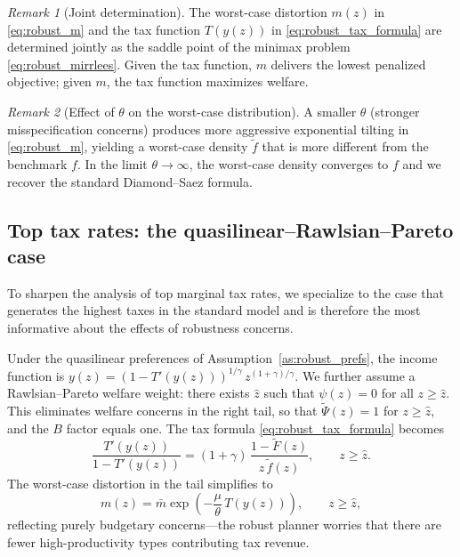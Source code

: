 \documentclass[12pt,a4paper]{article}
\theoremstyle{definition}
\theoremstyle{plain}
\theoremstyle{remark}
\newtheorem{remark}{Remark}[section]
\begin{document}
\begin{remark}[Joint determination]
The worst-case distortion $m(z)$ in \eqref{eq:robust_m} and the tax function $T(y(z))$ in \eqref{eq:robust_tax_formula} are determined jointly as the saddle point of the minimax problem \eqref{eq:robust_mirrlees}. Given the tax function, $m$ delivers the lowest penalized objective; given $m$, the tax function maximizes welfare.
\end{remark}

\begin{remark}[Effect of $\theta$ on the worst-case distribution]
A smaller $\theta$ (stronger misspecification concerns) produces more aggressive exponential tilting in \eqref{eq:robust_m}, yielding a worst-case density $\widetilde{f}$ that is more different from the benchmark $f$. In the limit $\theta \to \infty$, the worst-case density converges to $f$ and we recover the standard Diamond--Saez formula.
\end{remark}


\subsection{Top tax rates: the quasilinear--Rawlsian--Pareto case}
\label{sec:robust_top_rates}

To sharpen the analysis of top marginal tax rates, we specialize to the case that generates the highest taxes in the standard model and is therefore the most informative about the effects of robustness concerns.

Under the quasilinear preferences of Assumption~\ref{as:robust_prefs}, the income function is $y(z) = (1 - T'(y(z)))^{1/\gamma}\, z^{(1+\gamma)/\gamma}$. We further assume a Rawlsian--Pareto welfare weight: there exists $\hat{z}$ such that $\psi(z) = 0$ for all $z \geq \hat{z}$. This eliminates welfare concerns in the right tail, so that $\widetilde{\Psi}(z) = 1$ for $z \geq \hat{z}$, and the $B$ factor equals one. The tax formula \eqref{eq:robust_tax_formula} becomes
\begin{equation}
\label{eq:robust_top_formula}
  \frac{T'(y(z))}{1 - T'(y(z))} = (1+\gamma)\, \frac{1 - \widetilde{F}(z)}{z\, \widetilde{f}(z)},
  \qquad z \geq \hat{z}.
\end{equation}
The worst-case distortion in the tail simplifies to
\begin{equation}
\label{eq:robust_m_top}
  m(z) = \bar{m} \exp\!\left(-\frac{\mu}{\theta}\, T(y(z))\right), \qquad z \geq \hat{z},
\end{equation}
reflecting purely budgetary concerns---the robust planner worries that there are fewer high-productivity types contributing tax revenue.
\end{document}
